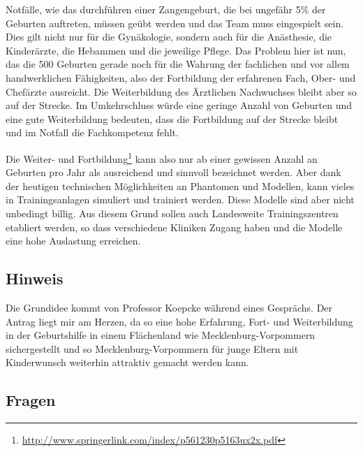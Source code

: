 Notfälle, wie das durchführen einer Zangengeburt, die bei ungefähr 5\% der Geburten auftreten, müssen geübt werden und das Team muss eingespielt sein. Dies gilt nicht nur für die Gynäkologie, sondern auch für die Anästhesie, die Kinderärzte, die Hebammen und die jeweilige Pflege. Das Problem hier ist nun, das die 500 Geburten gerade noch für die Wahrung der fachlichen und vor allem handwerklichen Fähigkeiten, also der Fortbildung der erfahrenen Fach, Ober- und Chefärzte ausreicht. Die Weiterbildung des Ärztlichen Nachwuchses bleibt aber so auf der Strecke. Im Umkehrschluss würde eine geringe Anzahl von Geburten und eine gute Weiterbildung bedeuten, dass die Fortbildung auf der Strecke bleibt und im Notfall die Fachkompetenz fehlt.

Die Weiter- und Fortbildung\footnote{\url{http://www.springerlink.com/index/p561230p5163ux2x.pdf}} kann also nur ab einer gewissen Anzahl an Geburten pro Jahr als ausreichend und sinnvoll bezeichnet werden. Aber dank der heutigen technischen Möglichkeiten an Phantomen und Modellen, kann vieles in Trainingsanlagen simuliert und trainiert werden. Diese Modelle sind aber nicht unbedingt billig. Aus diesem Grund sollen auch Landesweite Trainingszentren etabliert werden, so dass verschiedene Kliniken Zugang haben und die Modelle eine hohe Auslastung erreichen.

\subsection{Hinweis}

Die Grundidee kommt von Professor Koepcke während eines Gesprächs. Der Antrag liegt mir am Herzen, da so eine hohe Erfahrung, Fort- und Weiterbildung in der Geburtshilfe in einem Flächenland wie Mecklenburg-Vorpommern sichergestellt und so Mecklenburg-Vorpommern für junge Eltern mit Kinderwunsch weiterhin attraktiv gemacht werden kann.

\subsection{Fragen}

